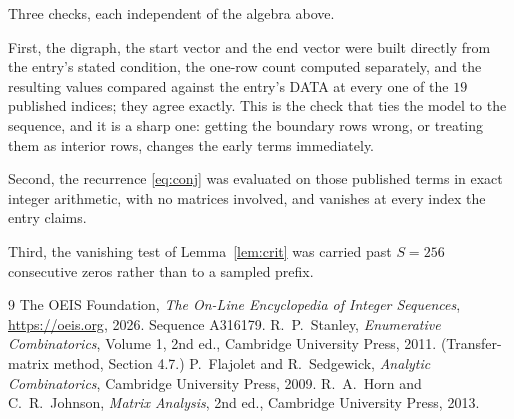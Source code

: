 \documentclass[11pt,a4paper]{article}
\theoremstyle{plain}
\theoremstyle{definition}
\begin{document}
Three checks, each independent of the algebra above.

First, the digraph, the start vector and the end vector were built directly from the
entry's stated condition, the one-row count computed separately, and the resulting values
compared against the entry's DATA at every one of the $19$ published indices; they
agree exactly. This is the check that ties the model to the sequence, and it is a sharp one:
getting the boundary rows wrong, or treating them as interior rows, changes the early terms
immediately.

Second, the recurrence \eqref{eq:conj} was evaluated on those published terms in exact
integer arithmetic, with no matrices involved, and vanishes at every index the entry claims.

Third, the vanishing test of Lemma~\ref{lem:crit} was carried past $S=256$ consecutive
zeros rather than to a sampled prefix.

\begin{thebibliography}{9}
 The OEIS Foundation, \emph{The On-Line Encyclopedia of Integer
Sequences}, \url{https://oeis.org}, 2026. Sequence A316179.
 R.~P.~Stanley, \emph{Enumerative Combinatorics}, Volume 1, 2nd ed.,
Cambridge University Press, 2011. (Transfer-matrix method, Section 4.7.)
 P.~Flajolet and R.~Sedgewick, \emph{Analytic Combinatorics}, Cambridge
University Press, 2009.
 R.~A.~Horn and C.~R.~Johnson, \emph{Matrix Analysis}, 2nd ed., Cambridge
University Press, 2013.
\end{thebibliography}
\end{document}
